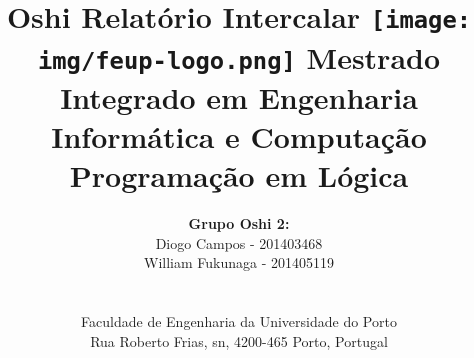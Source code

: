 \documentclass[a4paper]{article}
\begin{document}
\setlength{\textwidth}{16cm}
\setlength{\textheight}{22cm}

\title{\Huge\textbf{Oshi}\linebreak\linebreak\linebreak
\Large\textbf{Relatório Intercalar}\linebreak\linebreak
\linebreak\linebreak
\texttt{[image: img/feup-logo.png]}\linebreak\linebreak
\linebreak\linebreak
\Large{Mestrado Integrado em Engenharia Informática e Computação} \linebreak\linebreak
\Large{Programação em Lógica}\linebreak
}

\author{\textbf{Grupo Oshi 2:}\\
Diogo Campos - 201403468 \\
William Fukunaga - 201405119 \\
\linebreak\linebreak \\
 \\ Faculdade de Engenharia da Universidade do Porto \\ Rua Roberto Frias, s\/n, 4200-465 Porto, Portugal \linebreak\linebreak\linebreak
\linebreak\linebreak\vspace{1cm}}

\maketitle
\thispagestyle{empty}


\newpage
\end{document}
